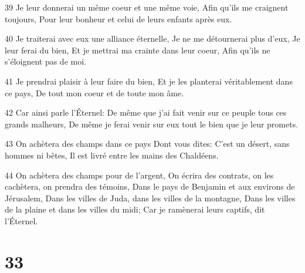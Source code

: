 \par 39 Je leur donnerai un même coeur et une même voie, Afin qu'ils me craignent toujours, Pour leur bonheur et celui de leurs enfants après eux.
\par 40 Je traiterai avec eux une alliance éternelle, Je ne me détournerai plus d'eux, Je leur ferai du bien, Et je mettrai ma crainte dans leur coeur, Afin qu'ils ne s'éloignent pas de moi.
\par 41 Je prendrai plaisir à leur faire du bien, Et je les planterai véritablement dans ce pays, De tout mon coeur et de toute mon âme.
\par 42 Car ainsi parle l'Éternel: De même que j'ai fait venir sur ce peuple tous ces grands malheurs, De même je ferai venir sur eux tout le bien que je leur promets.
\par 43 On achètera des champs dans ce pays Dont vous dites: C'est un désert, sans hommes ni bêtes, Il est livré entre les mains des Chaldéens.
\par 44 On achètera des champs pour de l'argent, On écrira des contrats, on les cachètera, on prendra des témoins, Dans le pays de Benjamin et aux environs de Jérusalem, Dans les villes de Juda, dans les villes de la montagne, Dans les villes de la plaine et dans les villes du midi; Car je ramènerai leurs captifs, dit l'Éternel.

\chapter{33}

